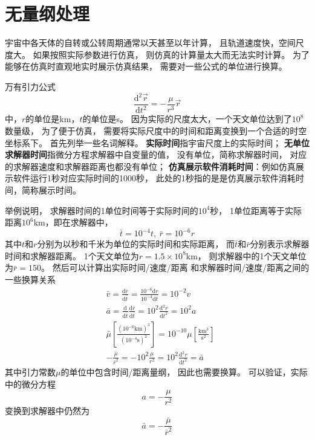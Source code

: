 \section{无量纲处理}
宇宙中各天体的自转或公转周期通常以天甚至以年计算，
且轨道速度快，空间尺度大。
如果按照实际参数进行仿真，
则仿真的计算量太大而无法实时计算。
为了能够在仿真时直观地实时展示仿真结果，
需要对一些公式的单位进行换算。

万有引力公式
\begin{equation}
    \frac{\text{d}^2\vec{r}}{\text{d}t^2}=-\frac{\mu}{r^3}\vec{r} \label{eqRealGravity}
\end{equation}
中，$r$的单位是km，$t$的单位是s。
因为实际的尺度太大，一个天文单位达到了$10^8$数量级，
为了便于仿真，
需要将实际尺度中的时间和距离变换到一个合适的时空坐标系下。
首先列举一些名词解释。
\textbf{实际时间}指宇宙尺度上的实际时间；
\textbf{无单位求解器时间}指微分方程求解器中自变量的值，
没有单位，简称求解器时间，
对应的求解器速度和求解器距离也都没有单位；
\textbf{仿真展示软件消耗时间}：例如仿真展示软件运行1秒对应实际时间的1000秒，
此处的1秒指的是是仿真展示软件消耗时间，简称展示时间。

举例说明，
求解器时间的1单位时间等于实际时间的$10^4$秒，
1单位距离等于实际距离$10^6$km，即在求解器中，
\begin{equation}
    \bar{t}=10^{-4}t,\ \bar{r}=10^{-6}r \label{eqRealConvert}
\end{equation}
其中$t$和$r$分别为以秒和千米为单位的实际时间和实际距离，
而$\bar{t}$和$\bar{r}$分别表示求解器时间和求解器距离。
1个天文单位为$r=1.5\times10^8$km，
则求解器中的1个天文单位为$\bar{r}=150$。
然后可以计算出实际时间/速度/距离
和求解器时间/速度/距离之间的一些换算关系
\begin{align*}
&\bar{v} = \frac{\text{d}\bar{r}}{\text{d}\bar{t}}
 = \frac{10^{-6}\text{d}r}{10^{-4}\text{d}t} = 10^{-2}v \\
&\bar{a} = \frac{\text{d}}{\text{d}\bar{t}}\frac{\text{d}\bar{r}}{\text{d}\bar{t}}
 = 10^2\frac{\text{d}^2r}{\text{d}t^2} = 10^2a \\
&\bar{\mu}\left[\frac{(10^{-6}\text{km})^3}{(10^{-4}\text{s})^2}\right]
 = 10^{-10}\mu\left[\frac{\text{km}^3}{\text{s}^2}\right] \\
&-\frac{\bar{\mu}}{\bar{r}^2} = -10^2\frac{\mu}{r^2}
 = 10^2\frac{\text{d}^2r}{\text{d}t^2} = \bar{a}
\end{align*}
其中引力常数$\mu$的单位中包含时间/距离量纲，
因此也需要换算。
可以验证，实际中的微分方程
$$a=-\frac{\mu}{r^2}$$
变换到求解器中仍然为
$$\bar{a}=-\frac{\bar{\mu}}{\bar{r}^2}$$

